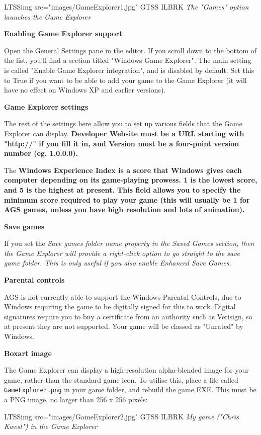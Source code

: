 LTSSimg src="images/GameExplorer1.jpg" GTSS ILBRK
\it{The "Games" option launches the Game Explorer}

\bf{Enabling Game Explorer support}

Open the General Settings pane in the editor. If you scroll down to the bottom of the
list, you'll find a section titled "Windows Game Explorer". The main setting
is called "Enable Game Explorer integration", and is disabled by default. Set this
to True if you want to be able to add your game to the Game Explorer (it will
have no effect on Windows XP and earlier versions).

\bf{Game Explorer settings}

The rest of the settings here allow you to set up various fields that the Game Explorer
can display. \bf{Developer Website} must be a URL starting with "http://" if you fill
it in, and \bf{Version} must be a four-point version number (eg. 1.0.0.0).

The \bf{Windows Experience Index} is a score that Windows gives each computer depending
on its game-playing prowess. 1 is the lowest score, and 5 is the highest at present.
This field allows you to specify the minimum score required to play your game (this
will usually be 1 for AGS games, unless you have high resolution and lots of animation).

\bf{Save games}

If you set the \it{Save games folder name} property in the Saved Games section, then
the Game Explorer will provide a right-click option to go straight to the save game folder.
This is only useful if you also enable Enhanced Save Games.

\bf{Parental controls}

AGS is not currently able to support the Windows Parental Controls, due to Windows requiring
the game to be digitally signed for this to work. Digital signatures require you to buy
a certificate from an authority such as Verisign, so at present they are not supported.
Your game will be classed as "Unrated" by Windows.

\bf{Boxart image}

The Game Explorer can display a high-resolution alpha-blended image for your game, rather
than the standard game icon. To utilise this, place a file called \verb$GameExplorer.png$
in your game folder, and rebuild the game EXE. This must be a PNG image, no larger
than 256 x 256 pixels:

LTSSimg src="images/GameExplorer2.jpg" GTSS ILBRK
\it{My game ("Chris Kwest") in the Game Explorer}

